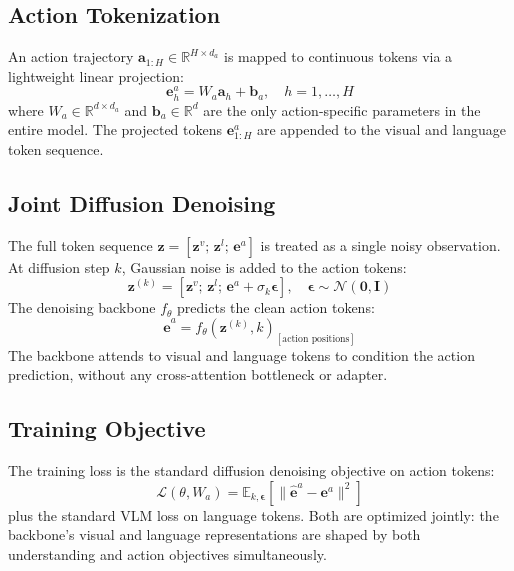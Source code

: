\documentclass[10pt,twocolumn]{article}
\begin{document}
\subsection*{Action Tokenization}

An action trajectory $\mathbf{a}_{1:H} \in \mathbb{R}^{H \times d_a}$ is mapped to continuous tokens via a lightweight linear projection:
\begin{equation}
\mathbf{e}^a_h = W_a \mathbf{a}_h + \mathbf{b}_a, \quad h = 1,\ldots,H
\label{eq:proj}
\end{equation}
where $W_a \in \mathbb{R}^{d \times d_a}$ and $\mathbf{b}_a \in \mathbb{R}^d$ are the only action-specific parameters in the entire model.
The projected tokens $\mathbf{e}^a_{1:H}$ are appended to the visual and language token sequence.

\subsection*{Joint Diffusion Denoising}

The full token sequence $\mathbf{z} = [\mathbf{z}^v;\, \mathbf{z}^l;\, \mathbf{e}^a]$ is treated as a single noisy observation.
At diffusion step $k$, Gaussian noise is added to the action tokens:
\begin{equation}
\mathbf{z}^{(k)} = [\mathbf{z}^v;\, \mathbf{z}^l;\, \mathbf{e}^a + \sigma_k \boldsymbol{\epsilon}], \quad \boldsymbol{\epsilon} \sim \mathcal{N}(\mathbf{0}, \mathbf{I})
\label{eq:noise}
\end{equation}
The denoising backbone $f_\theta$ predicts the clean action tokens:
\begin{equation}
\hat{\mathbf{e}}^a = f_\theta(\mathbf{z}^{(k)}, k)_{[\text{action positions}]}
\label{eq:denoise}
\end{equation}
The backbone attends to visual and language tokens to condition the action prediction, without any cross-attention bottleneck or adapter.

\subsection*{Training Objective}

The training loss is the standard diffusion denoising objective on action tokens:
\begin{equation}
\mathcal{L}(\theta, W_a) = \mathbb{E}_{k, \boldsymbol{\epsilon}}\!\left[\bigl\|\hat{\mathbf{e}}^a - \mathbf{e}^a\bigr\|^2\right]
\label{eq:loss}
\end{equation}
plus the standard VLM loss on language tokens.
Both are optimized jointly: the backbone's visual and language representations are shaped by both understanding and action objectives simultaneously.
\end{document}
